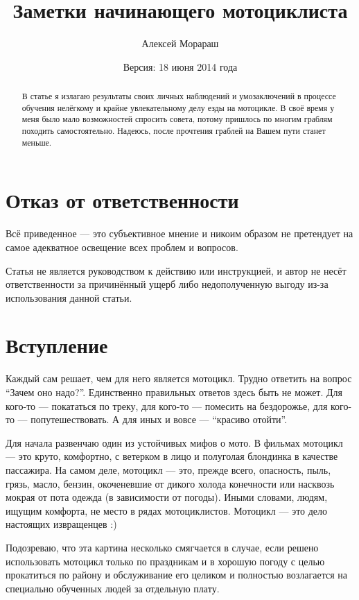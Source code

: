 \documentclass[12pt,a4paper]{article}
\title{Заметки начинающего мотоциклиста}
\author{Алексей Морараш}
\date{Версия: 18 июня 2014 года}
\begin{document}
\maketitle

\renewcommand{\contentsname}{Содержание}

\tableofcontents

\clearpage

\begin{abstract}
В статье я излагаю результаты своих личных наблюдений и умозаключений
в процессе обучения нелёгкому и крайне увлекательному делу езды на
мотоцикле. В своё время у меня было мало возможностей спросить совета,
потому пришлось по многим граблям походить самостоятельно. Надеюсь,
после прочтения граблей на Вашем пути станет меньше.
\end{abstract}

\section{Отказ от ответственности}

Всё приведенное --- это субъективное мнение и никоим образом не
претендует на самое адекватное освещение всех проблем и вопросов.

Статья не является руководством к действию или инструкцией,
и автор не несёт ответственности за причинённый ущерб либо
недополученную выгоду из-за использования данной статьи.

\section{Вступление}

Каждый сам решает, чем для него является мотоцикл. Трудно ответить
на вопрос ``Зачем оно надо?''. Единственно правильных ответов
здесь быть не может. Для кого-то --- покататься по треку, для кого-то ---
помесить на бездорожье, для кого-то --- попутешествовать. А для иных и
вовсе --- ``красиво отойти''.

Для начала развенчаю один из устойчивых мифов о мото. В фильмах
мотоцикл --- это круто, комфортно, с ветерком в лицо и полуголая
блондинка в качестве пассажира. На самом деле, мотоцикл --- это,
прежде всего, опасность, пыль, грязь, масло, бензин, окоченевшие
от дикого холода конечности или насквозь мокрая от пота одежда
(в зависимости от погоды). Иными словами, людям, ищущим комфорта,
не место в рядах мотоциклистов. Мотоцикл --- это дело настоящих
извращенцев :)

Подозреваю, что эта картина несколько смягчается в случае, если
решено использовать мотоцикл только по праздникам и в хорошую погоду
с целью прокатиться по району и обслуживание его целиком и полностью
возлагается на специально обученных людей за отдельную плату.
\end{document}

